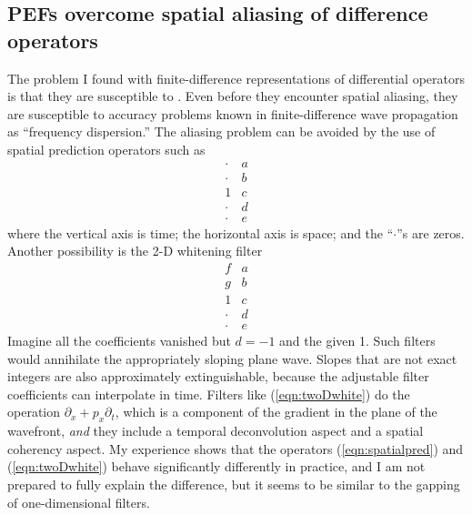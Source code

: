 \subsection{PEFs overcome spatial aliasing of difference operators}
The problem I found with
finite-difference representations of differential operators
is that they are susceptible to .
Even before they encounter spatial aliasing,
they are susceptible to accuracy problems known
in finite-difference wave propagation as ``frequency dispersion.''
The aliasing problem can be avoided by the use of spatial prediction operators
such as
\begin{equation}
   \begin{array}{cc}
      \cdot &a     \\
      \cdot &b     \\
      1     &c     \\
      \cdot &d     \\
      \cdot &e     \end{array}
\label{eqn:spatialpred}
\end{equation}
where the vertical axis is time;
the horizontal axis is space; and
the ``$\cdot$''s are zeros.
Another possibility is the 2-D whitening filter
\begin{equation}
   \begin{array}{cc}
      f     &a     \\
      g     &b     \\
      1     &c     \\
      \cdot &d     \\
      \cdot &e
      \end{array}
\label{eqn:twoDwhite}
\end{equation}
Imagine all the coefficients vanished but $d=-1$ and the given 1.
Such filters would annihilate the appropriately sloping plane wave.
Slopes that are not exact integers are also approximately extinguishable,
because the adjustable filter coefficients can interpolate in time.
Filters like (\ref{eqn:twoDwhite})
do the operation $\partial_x + p_x \partial_t$,
which is a component of the gradient in the plane of the wavefront,
{\it and}
they include a temporal deconvolution aspect
and a spatial coherency aspect.
My experience shows that the operators (\ref{eqn:spatialpred}) and
(\ref{eqn:twoDwhite})
behave significantly differently in practice,
and I am not prepared to fully explain the difference,
but it seems to be similar to the gapping of one-dimensional filters.

